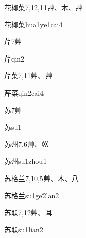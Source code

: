 \begin{Entry}{花椰菜}{7,12,11}{⾋、⽊、⾋}
  \begin{Phonetics}{花椰菜}{hua1ye1cai4}
  \end{Phonetics}
\end{Entry}

\begin{Entry}{芹}{7}{⾋}
  \begin{Phonetics}{芹}{qin2}
  \end{Phonetics}
\end{Entry}

\begin{Entry}{芹菜}{7,11}{⾋、⾋}
  \begin{Phonetics}{芹菜}{qin2cai4}
  \end{Phonetics}
\end{Entry}

\begin{Entry}{苏}{7}{⾋}
  \begin{Phonetics}{苏}{su1}
  \end{Phonetics}
\end{Entry}

\begin{Entry}{苏州}{7,6}{⾋、⼮}
  \begin{Phonetics}{苏州}{su1zhou1}
  \end{Phonetics}
\end{Entry}

\begin{Entry}{苏格兰}{7,10,5}{⾋、⽊、⼋}
  \begin{Phonetics}{苏格兰}{su1ge2lan2}
  \end{Phonetics}
\end{Entry}

\begin{Entry}{苏联}{7,12}{⾋、⽿}
  \begin{Phonetics}{苏联}{su1lian2}
  \end{Phonetics}
\end{Entry}

